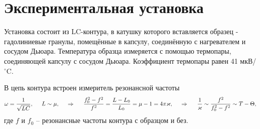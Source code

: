 \section*{Экспериментальная установка}

Установка состоит из LC-контура, в катушку которого вставляется образец - гадолиниевые гранулы,
помещённые в капсулу, соединённую с нагревателем и сосудом Дьюара. Температура
образца измеряется с помощью термопары, соединяющей капсулу с сосудом Дьюара. Коэффициент
термопары равен 41 мкВ/${}^\circ$C. 

В цепь контура встроен измеритель резонансной частоты
\begin{equation*}
    \omega = \frac{1}{\sqrt{LC}}, \hspace{5 mm} 
    L \sim \mu,
    \hspace{0.5cm} \Rightarrow \hspace{0.5cm}
    \frac{f_0^2 - f^2}{f^2} = \frac{L-L_0}{L_0} = \mu-1 = 4 \pi \varkappa,
    \hspace{0.5cm} \Rightarrow \hspace{0.5cm}
    \frac{1}{\varkappa} \sim \frac{f^2}{f_0^2-f^2} \sim T-\Theta,
\end{equation*}
где $f$ и $f_0$ -- резонансные частоты контура с образцом и без.